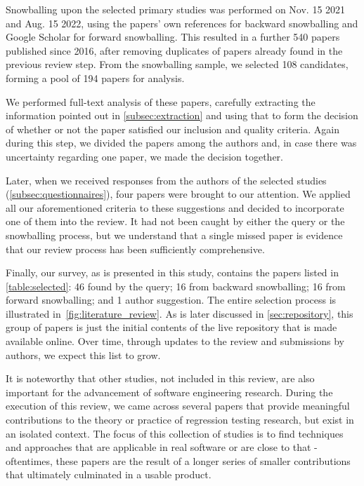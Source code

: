 Snowballing upon the selected primary studies was performed on Nov. 15 2021 and Aug. 15 2022, using the papers' own references for backward snowballing and Google Scholar for forward snowballing.
This resulted in a further 540 papers published since 2016, after removing duplicates of papers already found in the previous review step.
From the snowballing sample, we selected 108 candidates, forming a pool of 194 papers for analysis.

We performed full-text analysis of these papers, carefully extracting the information pointed out in \autoref{subsec:extraction} and using that to form the decision of whether or not the paper satisfied our inclusion and quality criteria.
Again during this step, we divided the papers among the authors and, in case there was uncertainty regarding one paper, we made the decision together.

Later, when we received responses from the authors of the selected studies (\autoref{subsec:questionnaires}), four papers were brought to our attention.
We applied all our aforementioned criteria to these suggestions and decided to incorporate one of them into the review.
It had not been caught by either the query or the snowballing process, but we understand that a single missed paper is evidence that our review process has been sufficiently comprehensive.

Finally, our survey, as is presented in this study, contains the \numpapers papers listed in \autoref{table:selected}: 46 found by the query; 16 from backward snowballing; 16 from forward snowballing; and 1 author suggestion.
The entire selection process is illustrated in~\autoref{fig:literature_review}.
As is later discussed in \autoref{sec:repository}, this group of papers is just the initial contents of the live repository that is made available online.
Over time, through updates to the review and submissions by authors, we expect this list to grow.

It is noteworthy that other studies, not included in this review, are also important for the advancement of software engineering research.
During the execution of this review, we came across several papers that provide meaningful contributions to the theory or practice of regression testing research, but exist in an isolated context.
The focus of this collection of studies is to find techniques and approaches that are applicable in real software or are close to that \-- oftentimes, these papers are the result of a longer series of smaller contributions that ultimately culminated in a usable product.

